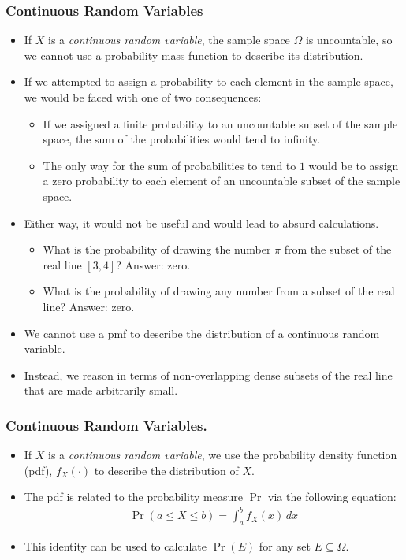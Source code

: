 \begin{frame}
\frametitle{Continuous Random Variables}
\begin{itemize}
\item If $X$ is a \emph{continuous random variable}, the sample space $\Omega$ is uncountable, so we cannot use a probability mass function to describe its distribution. 
\item If we attempted to assign a probability to each element in the sample space, we would be faced with one of two consequences: 
\begin{itemize}
\item If we assigned a finite probability to an uncountable subset of the sample space, the sum of the probabilities would tend to infinity. 
\item The only way for the sum of probabilities to tend to $1$ would be to assign a zero probability to each element of an uncountable subset of the sample space.
\end{itemize}
\item Either way, it would not be useful and would lead to absurd calculations. 
\begin{itemize}
\item What is the probability of drawing the number $\pi$ from the subset of the real line $[3,4]$? Answer: zero.
\item What is the probability of drawing any number from a subset of the real line? Answer: zero.
\end{itemize}
\item We cannot use a pmf to describe the distribution of a continuous random variable. 
\item Instead, we reason in terms of non-overlapping dense subsets of the real line that are made arbitrarily small. 
\end{itemize}
\end{frame}


\begin{frame}
\frametitle{Continuous Random Variables.} 
\begin{itemize}
\item If $X$ is a \emph{continuous random variable}, we use the probability density function (pdf), $f_X(\cdot)$ to describe the distribution of $X$. 
\item The pdf is related to the probability measure $\Pr$ via the following equation:
\begin{align*}
\Pr(a \leq X \leq b) 
    = \int_a^b f_X(x)\,dx
\end{align*}
\item This identity can be used to calculate $\Pr(E)$ for any set $E\subseteq \Omega$.
\end{itemize}
\end{frame}



